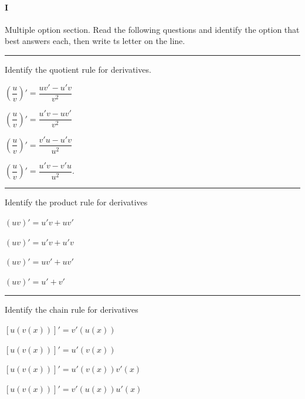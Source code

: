 
\paragraph{I} Multiple option section. 
Read the following questions and identify the option that best answers each, then write ts letter on the line.

\begin{preguntas}

\pregunta[4] \rule{1cm}{0.1mm} Identify the quotient rule for derivatives. 

\begin{enumerate*}[label=(\alph*)]
    \item \(\left(\dfrac{u}{v}\right)' = \dfrac{uv' - u'v}{v^2}\) \hspace{2em} 
    \item \(\left(\dfrac{u}{v}\right)' = \dfrac{u'v - uv'}{v^2}\) \hspace{2em}
    \item \(\left(\dfrac{u}{v}\right)' = \dfrac{v'u - u'v}{u^2}\)\hspace{2em}
    \item \(\left(\dfrac{u}{v}\right)' = \dfrac{u'v - v'u}{u^2}\). 
\end{enumerate*}

\pregunta[4] \rule{1cm}{0.1mm} Identify the product rule for derivatives 

\begin{enumerate*}[label=(\alph*)]
    \item \( (uv)' = u'v + uv' \) 
    \item \( (uv)' = u'v + u'v \)
    \item \( (uv)' = uv' + uv' \)
    \item \( (uv)' = u' + v' \)
\end{enumerate*}

\pregunta[4] \rule{1cm}{0.1mm} Identify the chain rule for derivatives 

\begin{enumerate*}[label=(\alph*)]
    \item \( \left[u(v(x))\right]' = v'(u(x)) \) 
    \item \( \left[u(v(x))\right]' = u'(v(x)) \)
    \item \( \left[u(v(x))\right]' = u'(v(x))v'(x) \)
    \item \( \left[u(v(x))\right]' = v'(u(x))u'(x) \)
\end{enumerate*}


\end{preguntas}
